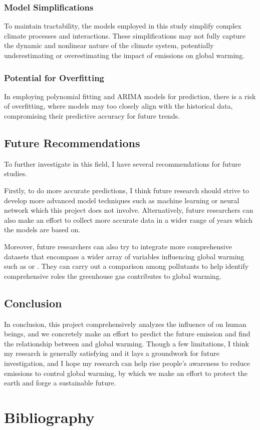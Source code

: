 \documentclass[12pt,a4paper]{article}
\begin{document}
    \subsubsection*{Model Simplifications}
    To maintain tractability, the models employed in this study simplify complex climate processes and interactions. These simplifications may not fully capture the dynamic and nonlinear nature of the climate system, potentially underestimating or overestimating the impact of  emissions on global warming.

    \subsubsection*{Potential for Overfitting}
    In employing polynomial fitting and ARIMA models for prediction, there is a risk of overfitting, where models may too closely align with the historical data, compromising their predictive accuracy for future trends.
    
    \subsection{Future Recommendations}
    To further investigate in this field, I have several recommendations for future studies. 
    
    Firstly, to do more accurate predictions, I think future research should strive to develop more advanced model techniques such as machine learning or neural network which this project does not involve. Alternatively, future researchers can also make an effort to collect more accurate data in a wider range of years which the models are based on. 

    Moreover, future researchers can also try to integrate more comprehensive datasets that encompass a wider array of variables influencing global warming such as  or . They can carry out a comparison among pollutants to help identify comprehensive roles the greenhouse gas contributes to global warming.

    \subsection{Conclusion}    
    In conclusion, this project comprehensively analyzes the influence of  on human beings, and we concretely make an effort to predict the future  emission and find the relationship between  and global warming. Though a few limitations, I think my research is generally satisfying and it lays a groundwork for future investigation, and I hope my research can help rise people's awareness to reduce  emissions to control global warming, by which we make an effort to protect the earth and forge a sustainable future.
    
    \newpage
    \section{Bibliography}
    \printbibliography[heading=none]
    
\end{document}
